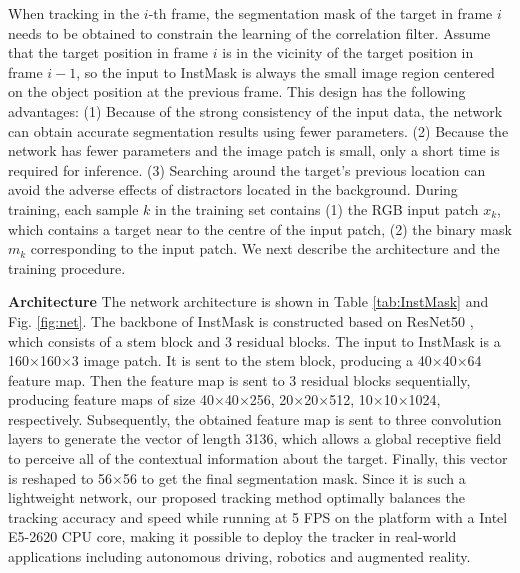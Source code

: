 When tracking in the $i$-th frame, the segmentation mask of the target in frame $i$ needs to be obtained to constrain the learning of the correlation filter. 
Assume that the target position in frame $i$ is in the vicinity of the target position in frame $i-1$, so the input to InstMask is always the small image region centered on the object position at the previous frame.
This design has the following advantages: (1) Because of the strong consistency of the input data, the network can obtain accurate segmentation results using fewer parameters. (2) Because the network has fewer parameters and the image patch is small, only a short time is required for inference. (3) Searching around the target's previous location can avoid the adverse effects of distractors located in the background. During training, each sample $k$ in the training set contains (1) the RGB input patch $x_k$, which contains a target near to the centre of the input patch, (2) the binary mask $m_{k}$ corresponding to the input patch.
We next describe the architecture and the training procedure.

\textbf{Architecture} The network architecture is shown in Table \ref{tab:InstMask} and Fig. \ref{fig:net}. The backbone of InstMask is constructed based on ResNet50 \cite{he2016deep}, which consists of a stem block and 3 residual blocks.
The input to InstMask is a 160$\times$160$\times$3 image patch. It is sent to the stem block, producing a 40$\times$40$\times$64 feature map. Then the feature map is sent to 3 residual blocks sequentially, producing feature maps of size 40$\times$40$\times$256, 20$\times$20$\times$512, 10$\times$10$\times$1024, respectively. Subsequently, the obtained feature map is sent to three convolution layers to generate the vector of length 3136, which allows a global receptive field to perceive all of the contextual information about the target. Finally, this vector is reshaped to 56$\times$56 to get the final segmentation mask. Since it is such a lightweight network, our proposed tracking method optimally balances the tracking accuracy and speed while running at 5 FPS on the platform with a Intel E5-2620 CPU core, making it possible to deploy the tracker in real-world applications including autonomous driving, robotics and augmented reality.

